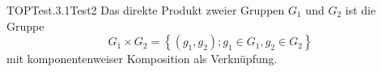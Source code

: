 \begin{DEF}{TOPTest.3.1}{Test2}
Das direkte Produkt zweier Gruppen $G_1$ und $G_2$ ist die Gruppe
    $$
    G_1 \times G_2=\left\{\left(g_1, g_2\right) ; g_1 \in G_1, g_2 \in G_2\right\}
    $$
    mit komponentenweiser Komposition als Verknüpfung.
\end{DEF}

